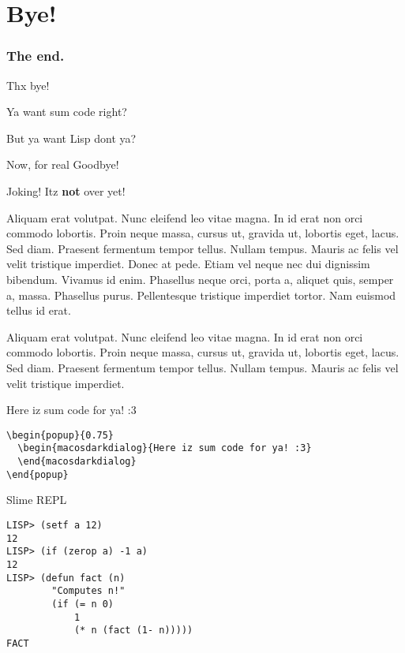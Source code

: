 \documentclass{beamer}
\begin{document}
\section{Bye!}
\newcommand{\monly}[2]{\only<#1>{#2}}
\begin{frame}[fragile]
  \frametitle{The end.}
  Thx bye!
  \pause

  \pause
  Ya want sum code right?
  \pause

  \pause
  But ya want Lisp dont ya?
  \pause

  \pause
  \begin{block}{Now, for real}
    Goodbye!
  \end{block}

  \begin{popup}{0.75}
    \begin{macosdialog}{Joking!}
      Itz \textbf{not} over yet!

      Aliquam erat volutpat. Nunc eleifend leo vitae magna. In id erat non
      orci commodo lobortis. Proin neque massa, cursus ut, gravida ut,
      lobortis eget, lacus. Sed diam. Praesent fermentum tempor tellus. Nullam
      tempus. Mauris ac felis vel velit tristique imperdiet. Donec at pede.
      Etiam vel neque nec dui dignissim bibendum. Vivamus id enim. Phasellus
      neque orci, porta a, aliquet quis, semper a, massa. Phasellus purus.
      Pellentesque tristique imperdiet tortor. Nam euismod tellus id erat.

      Aliquam erat volutpat. Nunc eleifend leo vitae magna. In id erat non
      orci commodo lobortis. Proin neque massa, cursus ut, gravida ut,
      lobortis eget, lacus. Sed diam. Praesent fermentum tempor tellus. Nullam
      tempus. Mauris ac felis vel velit tristique imperdiet.
    \end{macosdialog}

    \begin{macosdarkdialog}{Here iz sum code for ya! :3}
      \begin{verbatim}
\begin{popup}{0.75}
  \begin{macosdarkdialog}{Here iz sum code for ya! :3}
  \end{macosdarkdialog}
\end{popup}
      \end{verbatim}
    \end{macosdarkdialog}
  \end{popup}

  \begin{popup}{.75}
    \begin{macosdarkdialog}{Slime REPL}
      \begin{verbatim}
LISP> (setf a 12)
12
LISP> (if (zerop a) -1 a)
12
LISP> (defun fact (n)
        "Computes n!"
        (if (= n 0)
            1
            (* n (fact (1- n)))))
FACT
      \end{verbatim}
    \end{macosdarkdialog}
  \end{popup}
\end{frame}
\end{document}
